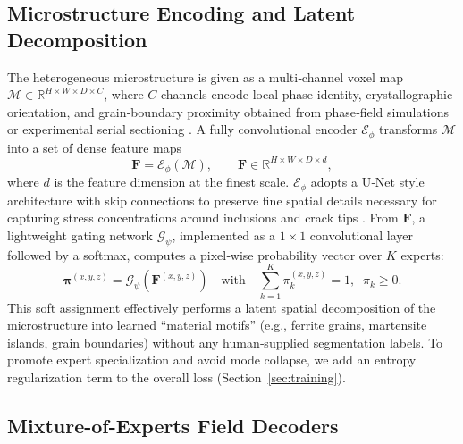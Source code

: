 \documentclass{article}
\begin{document}
\subsection{Microstructure Encoding and Latent Decomposition}
\label{sec:encoder}

The heterogeneous microstructure is given as a multi‑channel voxel map \(\mathcal{M} \in \mathbb{R}^{H \times W \times D \times C}\), where \(C\) channels encode local phase identity, crystallographic orientation, and grain‑boundary proximity obtained from phase‑field simulations or experimental serial sectioning \cite{chen_phase_field_2002,miller_3d_microscopy_2020}. A fully convolutional encoder \(\mathcal{E}_\phi\) transforms \(\mathcal{M}\) into a set of dense feature maps
\begin{equation}
  \mathbf{F} = \mathcal{E}_\phi(\mathcal{M}), \qquad \mathbf{F} \in \mathbb{R}^{H \times W \times D \times d},
\end{equation}
where \(d\) is the feature dimension at the finest scale. \(\mathcal{E}_\phi\) adopts a U‑Net style architecture with skip connections to preserve fine spatial details necessary for capturing stress concentrations around inclusions and crack tips \cite{ronneberger_unet_2015}. From \(\mathbf{F}\), a lightweight gating network \(\mathcal{G}_\psi\), implemented as a \(1\times1\) convolutional layer followed by a softmax, computes a pixel‑wise probability vector over \(K\) experts:
\begin{equation}
  \boldsymbol{\pi}^{(x,y,z)} = \mathcal{G}_\psi(\mathbf{F}^{(x,y,z)}) \quad \text{with} \quad \sum_{k=1}^K \pi_k^{(x,y,z)} = 1,\;\; \pi_k \ge 0.
\end{equation}
This soft assignment effectively performs a latent spatial decomposition of the microstructure into learned “material motifs” (e.g., ferrite grains, martensite islands, grain boundaries) without any human‑supplied segmentation labels. To promote expert specialization and avoid mode collapse, we add an entropy regularization term to the overall loss (Section~\ref{sec:training}).

\subsection{Mixture-of-Experts Field Decoders}
\label{sec:moes}
\end{document}
